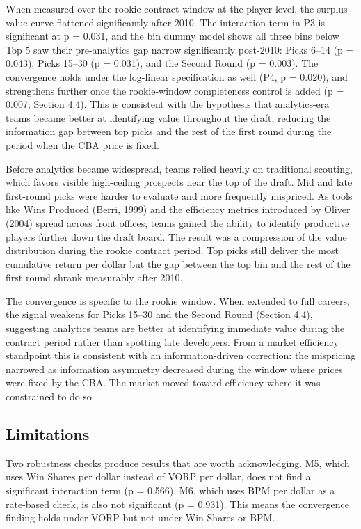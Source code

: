 \documentclass[12pt,letterpaper]{article}
\begin{document}
When measured over the rookie contract window at the player level, the surplus value curve flattened significantly after 2010. The interaction term in P3 is significant at p = 0.031, and the bin dummy model shows all three bins below Top 5 saw their pre-analytics gap narrow significantly post-2010: Picks 6--14 (p = 0.043), Picks 15--30 (p = 0.031), and the Second Round (p = 0.003). The convergence holds under the log-linear specification as well (P4, p = 0.020), and strengthens further once the rookie-window completeness control is added (p = 0.007; Section 4.4). This is consistent with the hypothesis that analytics-era teams became better at identifying value throughout the draft, reducing the information gap between top picks and the rest of the first round during the period when the CBA price is fixed.

Before analytics became widespread, teams relied heavily on traditional scouting, which favors visible high-ceiling prospects near the top of the draft. Mid and late first-round picks were harder to evaluate and more frequently mispriced. As tools like Wins Produced (Berri, 1999) and the efficiency metrics introduced by Oliver (2004) spread across front offices, teams gained the ability to identify productive players further down the draft board. The result was a compression of the value distribution during the rookie contract period. Top picks still deliver the most cumulative return per dollar but the gap between the top bin and the rest of the first round shrank measurably after 2010.

The convergence is specific to the rookie window. When extended to full careers, the signal weakens for Picks 15--30 and the Second Round (Section 4.4), suggesting analytics teams are better at identifying immediate value during the contract period rather than spotting late developers. From a market efficiency standpoint this is consistent with an information-driven correction: the mispricing narrowed as information asymmetry decreased during the window where prices were fixed by the CBA. The market moved toward efficiency where it was constrained to do so.


\subsection{Limitations}

Two robustness checks produce results that are worth acknowledging. M5, which uses Win Shares per dollar instead of VORP per dollar, does not find a significant interaction term (p = 0.566). M6, which uses BPM per dollar as a rate-based check, is also not significant (p = 0.931). This means the convergence finding holds under VORP but not under Win Shares or BPM.
\end{document}
